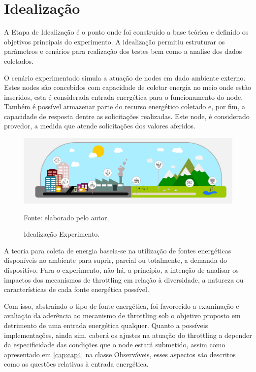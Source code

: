 \section{Idealização}
A Etapa de Idealização é o ponto onde foi construído a base teórica e definido os objetivos principais do experimento. A idealização permitiu estruturar os parâmetros e cenários para realização dos testes bem como a analise dos dados coletados.

O cenário experimentado simula a atuação de nodes em dado ambiente externo. Estes nodes são concebidos com capacidade de coletar energia no meio onde estão inseridos, esta é considerada entrada energética para o funcionamento do node. Também é possível armazenar parte do recurso energético coletado e, por fim, a capacidade de resposta dentre as solicitações realizadas. Este node, é considerado provedor, a medida que atende solicitações dos valores aferidos.


\begin{figure}[H]
	\centering
	\caption{Idealização Experimento.}
	\label{fig:cap6idealizacao}
	\includegraphics[width=1\linewidth]{Imagens/cap6/cap6idealização.jpg}
	
	Fonte: elaborado pelo autor.
\end{figure} 


A teoria para coleta de energia baseia-se na utilização de fontes energéticas disponíveis no ambiente para suprir, parcial ou totalmente, a demanda do dispositivo. Para o experimento, não há, a princípio, a intenção de analisar os impactos dos mecanismos de throttling em relação à diversidade, a natureza ou características de cada fonte energética possível.

Com isso, abstraindo o tipo de fonte energética, foi favorecido a examinação e avaliação da aderência ao mecanismo de throttling sob o objetivo proposto em detrimento de uma entrada energética qualquer. Quanto a possíveis implementações, ainda sim, caberá os ajustes na atuação do throttling a depender da especificidade das condições que o node estará submetido, assim como apresentado em \ref{cap:cap4} na classe Observáveis, esses aspectos são descritos como as questões relativas à entrada energética. 

